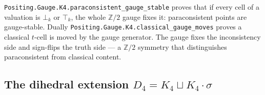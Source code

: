 \begin{theorem}\label{thm:gauge-stable}\leanok{}
\texttt{Positing.Gauge.K4.paraconsistent\_gauge\_stable} proves that if every cell of a valuation is $\bot_k$ or $\top_k$, the whole $\mathbb{Z}/2$ gauge fixes it: paraconsistent points are gauge-stable. Dually \texttt{Positing.Gauge.K4.classical\_gauge\_moves} proves a classical $t$-cell is moved by the gauge generator. The gauge fixes the inconsistency side and sign-flips the truth side --- a $\mathbb{Z}/2$ symmetry that distinguishes paraconsistent from classical content.
\end{theorem}

\subsection{The dihedral extension $D_4 = K_4 \sqcup K_4\cdot\sigma$}

